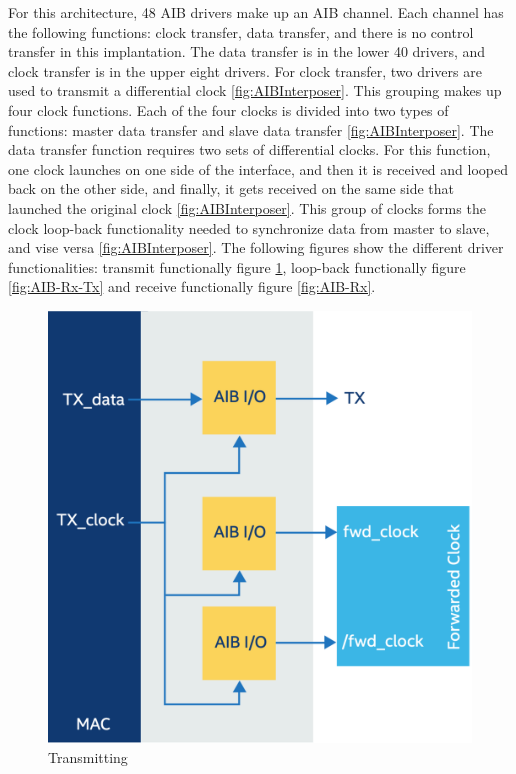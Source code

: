 \documentclass[../main.tex]{subfiles}
\begin{document}
 For this architecture, 48 AIB drivers make up an AIB channel. Each channel has the following functions: clock transfer, data transfer, and there is no control transfer in this implantation. The data transfer is in the lower 40 drivers, and clock transfer is in the upper eight drivers. For clock transfer, two drivers are used to transmit a differential clock \ref{fig:AIBInterposer}. This grouping makes up four clock functions. Each of the four clocks is divided into two types of functions: master data transfer and slave data transfer \ref{fig:AIBInterposer}. The data transfer function requires two sets of differential clocks. For this function, one clock launches on one side of the interface, and then it is received and looped back on the other side, and finally, it gets received on the same side that launched the original clock \ref{fig:AIBInterposer}. This group of clocks forms the clock loop-back functionality needed to synchronize data from master to slave, and vise versa \ref{fig:AIBInterposer}. The following figures show the different driver functionalities: transmit functionally figure \ref{fig:AIB-Tx}, loop-back functionally figure \ref{fig:AIB-Rx-Tx} and receive functionally figure \ref{fig:AIB-Rx}. 

\begin{figure}
    \centering
    \includegraphics[scale=.16]{pngs/AIB-Tx.png}
    \caption{Transmitting\cite{AIBWhitePaper}}
    \label{fig:AIB-Tx}
\end{figure}
\end{document}
